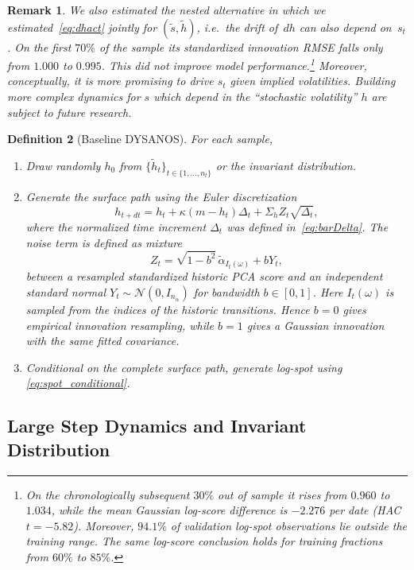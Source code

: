 \documentclass[11pt,a4paper]{article}
\newtheorem{definition}{Definition}[section]
\newtheorem{remark}[definition]{Remark}
\begin{document}
\begin{remark}
We also estimated the nested alternative in which we estimated~\eqref{eq:dhact} jointly for $(\tilde s, \tilde h)$,
i.e.~the drift of~$dh$
can also depend on~$s_t$. On the first $70\%$ of the sample its
standardized innovation RMSE falls only from $1.000$ to $0.995$. This did not improve
model performance.\footnote{On the
chronologically subsequent $30\%$ out of sample it rises from $0.960$ to $1.034$, while the
mean Gaussian log-score difference is $-2.276$ per date (HAC
$t=-5.82$). Moreover, $94.1\%$ of validation log-spot observations lie outside
the training range. The same log-score conclusion holds for training fractions
from $60\%$ to $85\%$.} Moreover, conceptually, it is more promising to drive $s_t$
given implied volatilities. Building more complex dynamics for $s$ which
depend in the ``stochastic volatility'' $h$ are subject to future research.
\end{remark}

\begin{definition}[Baseline DYSANOS] 
For each sample,
\begin{enumerate}
    \item Draw randomly $h_0$ from $\{ \tilde h_t \}_{t\in\{1,\ldots,n_t\}}$ or the invariant distribution.
    \item 
    Generate the surface path using the Euler discretization
\begin{equation}\label{eq:sim_dummy}
    h_{t+dt}= h_t+\kappa (m-h_t)\Delta_t
        +\Sigma_h Z_t\sqrt{\Delta_t},
\end{equation}
where the normalized time increment $\Delta_t$ was defined in~\eqref{eq:barDelta}.
The noise term is defined as mixture
$$
    Z_t=\sqrt{1-b^2}\,\tilde\alpha_{I_t(\omega)}+bY_t,
$$
between a resampled standardized historic PCA score and an independent standard
normal $Y_t\sim\mathcal N(0,I_{n_\alpha})$ for bandwidth $b\in[0,1]$.
Here $I_t(\omega)$ is sampled from the indices of the historic transitions.
Hence $b=0$ gives empirical innovation resampling, while $b=1$ gives a
Gaussian innovation with the same fitted covariance.
    \item Conditional on the complete surface path, generate log-spot using
    \eqref{eq:spot_conditional}.
\end{enumerate}
\end{definition}

\subsection{Large Step Dynamics and Invariant Distribution}
\end{document}
